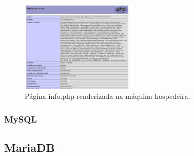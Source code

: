 \begin{figure}[H]
    \centering
    \includegraphics[width=0.5\textwidth]{../images/php2.png}
    \caption{Página info.php renderizada na máquina hospedeira.}
    \label{fig:info.php}
\end{figure}

\subsubsection{MySQL}\label{mysql}

\subsection{MariaDB}\label{mariadb}

 \blindtext

 \blindtext

 \blindtext









